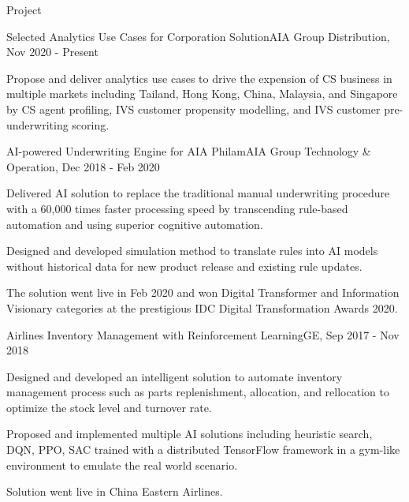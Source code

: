 \documentclass{resume} %
\begin{document}
\begin{rSection}{Project}

\begin{rSubsection}{Selected Analytics Use Cases for Corporation Solution}{}{AIA Group Distribution, Nov 2020 - Present}{}
\item Propose and deliver analytics use cases to drive the expension of CS business in multiple markets including Tailand, Hong Kong, China, Malaysia, and Singapore by CS agent profiling, IVS customer propensity modelling, and IVS customer pre-underwriting scoring.
\end{rSubsection}


\begin{rSubsection}{AI-powered Underwriting Engine for AIA Philam}{}{AIA Group Technology \& Operation, Dec 2018 - Feb 2020}{}
\item Delivered AI solution to replace the traditional manual underwriting procedure with a 60,000 times faster processing speed by transcending rule-based automation and using superior cognitive automation.
\item Designed and developed simulation method to translate rules into AI models without historical data for new product release and existing rule updates.
\item The solution went live in Feb 2020 and won Digital Transformer and Information Visionary categories at the prestigious IDC Digital Transformation Awards 2020.
\end{rSubsection}


\begin{rSubsection}{Airlines Inventory Management with Reinforcement Learning}{}{GE, Sep 2017 - Nov 2018}{}
\item Designed and developed an intelligent solution to automate inventory management process such as parts replenishment, allocation, and rellocation to optimize the stock level and turnover rate. 
\item Proposed and implemented multiple AI solutions including heuristic search, DQN, PPO, SAC trained with a distributed TensorFlow framework in a gym-like environment to emulate the real world scenario.
\item Solution went live in China Eastern Airlines.
\end{rSubsection}



\end{rSection}
\end{document}
